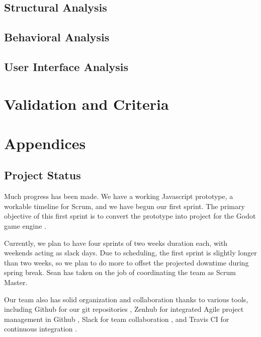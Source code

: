 \documentclass[12pt]{article}
\begin{document}
\subsection{Structural Analysis}\label{struct-analysis-BC}

\subsection{Behavioral Analysis}\label{behavioral-analysis-HR}

\subsection{User Interface Analysis}\label{UI-analysis-CA}

\section{Validation and Criteria}\label{validation-BC}

\section{Appendices}

\subsection{Project Status}\label{status-ST}

Much progress has been made. We have a working Javascript prototype, a 
workable timeline for Scrum, and we have begun our first sprint. The 
primary objective of this first sprint is to convert the prototype 
into project for the Godot game engine \cite{godot:gameengine}. 

Currently, we plan to have four sprints of two weeks duration each, 
with weekends acting as slack days. Due to scheduling, the first 
sprint is slightly longer than two weeks, so we plan to do more to 
offset the projected downtime during spring break. Sean has taken on the job of coordinating the team as Scrum Master.

Our team also has solid organization and collaboration thanks to various tools, including Github for our git repositories \cite{github:site}, Zenhub for integrated Agile project management in Github \cite{zenhub:site}, Slack for team collaboration \cite{slack:site}, and Travis CI for continuous integration \cite{travis:site}. 
\end{document}
